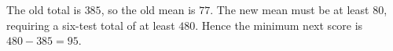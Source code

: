 The old total is $385$, so the old mean is $77$. The new mean must be at least $80$, requiring a six-test total of at least $480$. Hence the minimum next score is $480-385=\boxed{95}$.
